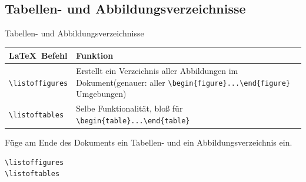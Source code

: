 \subsection{Tabellen- und Abbildungsverzeichnisse}
\begin{frame}[c]
	\begin{center}
		\large Tabellen- und Abbildungsverzeichnisse
	\end{center}
\end{frame}
\begin{frame}[fragile]
	\begin{center}
		\begin{tabular}{lp{8cm}}
			\toprule
			\LaTeX\ Befehl					&	Funktion								\\ \midrule
			\lstinline|\listoffigures|		&	Erstellt ein Verzeichnis aller Abbildungen im Dokument\newline(genauer: aller \lstinline[basicstyle=\normalsize\normalfont]|\begin{figure}...\end{figure}| Umgebungen)		\\
			\lstinline|\listoftables|		&	Selbe Funktionalität, bloß für \lstinline[basicstyle=\normalsize\normalfont]|\begin{table}...\end{table}|			\\
			\bottomrule
		\end{tabular}
	\end{center}
	
	\pause\btVFill
	\begin{Aufgabe}
		Füge am Ende des Dokuments ein Tabellen- und ein Abbildungsverzeichnis ein.
	\end{Aufgabe}
	\vspace{0.3cm}
\end{frame}
\begin{frame}[fragile]
	\Code
	\begin{lstlisting}
\listoffigures
\listoftables
	\end{lstlisting}
\end{frame}